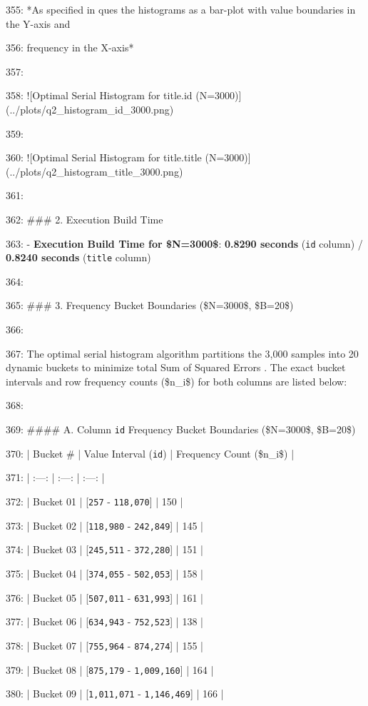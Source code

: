 \documentclass[11pt,a4paper]{article}
\begin{document}
355: *As specified in ques the histograms as a bar-plot with value boundaries in the Y-axis and

356: frequency in the X-axis*

357:

358: ![Optimal Serial Histogram for title.id (N=3000)](../plots/q2\_histogram\_id\_3000.png)

359:

360: ![Optimal Serial Histogram for title.title (N=3000)](../plots/q2\_histogram\_title\_3000.png)

361:

362: \#\#\# 2. Execution Build Time

363: - \textbf{Execution Build Time for \$N=3000\$}: \textbf{0.8290 seconds} (\texttt{id} column) / \textbf{0.8240 seconds} (\texttt{title} column)

364:

365: \#\#\# 3. Frequency Bucket Boundaries (\$N=3000\$, \$B=20\$)

366:

367: The optimal serial histogram algorithm partitions the 3,000 samples into 20 dynamic buckets to minimize total Sum of Squared Errors . The exact bucket intervals and row frequency counts (\$n\_i\$) for both columns are listed below:

368:

369: \#\#\#\# A. Column \texttt{id} Frequency Bucket Boundaries (\$N=3000\$, \$B=20\$)

370: | Bucket \# | Value Interval (\texttt{id}) | Frequency Count (\$n\_i\$) |

371: | :---: | :---: | :---: |

372: | Bucket 01 | [\texttt{257} - \texttt{118,070}] | 150 |

373: | Bucket 02 | [\texttt{118,980} - \texttt{242,849}] | 145 |

374: | Bucket 03 | [\texttt{245,511} - \texttt{372,280}] | 151 |

375: | Bucket 04 | [\texttt{374,055} - \texttt{502,053}] | 158 |

376: | Bucket 05 | [\texttt{507,011} - \texttt{631,993}] | 161 |

377: | Bucket 06 | [\texttt{634,943} - \texttt{752,523}] | 138 |

378: | Bucket 07 | [\texttt{755,964} - \texttt{874,274}] | 155 |

379: | Bucket 08 | [\texttt{875,179} - \texttt{1,009,160}] | 164 |

380: | Bucket 09 | [\texttt{1,011,071} - \texttt{1,146,469}] | 166 |
\end{document}
